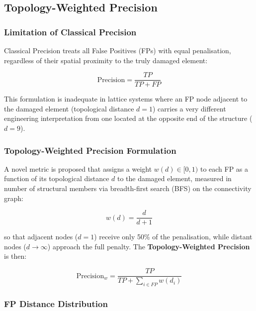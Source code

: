 \documentclass[a4paper,fleqn,nologo]{cas-dc}
\begin{document}
\subsection{Topology-Weighted Precision}
\label{subsec:precision_ponderada}

\subsubsection{Limitation of Classical Precision}

Classical Precision treats all False Positives (FPs) with equal penalisation,
regardless of their spatial proximity to the truly damaged element:

\begin{equation}
    \label{eq:precision_clasica}
    \text{Precision} = \frac{TP}{TP + FP}
\end{equation}

This formulation is inadequate in lattice systems where an FP node adjacent
to the damaged element (topological distance $d=1$) carries a very different engineering
interpretation from one located at the opposite end of the structure ($d = 9$).

\subsubsection{Topology-Weighted Precision Formulation}

A novel metric is proposed that assigns a weight $w(d) \in [0, 1)$ to each FP as a function
of its topological distance $d$ to the damaged element, measured in number of structural
members via breadth-first search (BFS) on the connectivity graph:

\begin{equation}
    \label{eq:weight_fn}
    w(d) = \frac{d}{d + 1}
\end{equation}

so that adjacent nodes ($d=1$) receive only 50\% of the penalisation, while
distant nodes ($d \to \infty$) approach the full penalty. The \textbf{Topology-Weighted
Precision} is then:

\begin{equation}
    \label{eq:precision_ponderada}
    \text{Precision}_w = \frac{TP}{TP + \displaystyle\sum_{i \in FP} w(d_i)}
\end{equation}

\subsubsection{FP Distance Distribution}
\end{document}
